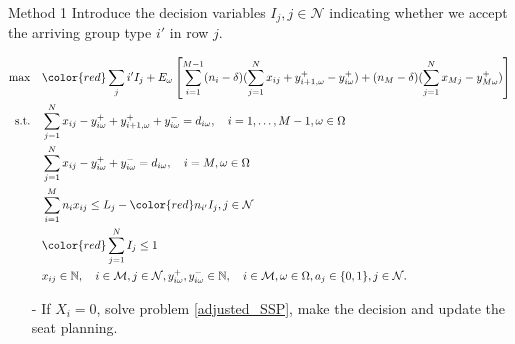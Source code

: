   \begin{frame}{Method 1}
    \small
    Introduce the decision variables $I_j, j \in \mathcal{N}$ indicating whether we accept the arriving group type $i{'}$ in row $j$.
    
      \begin{tiny}
        \begin{equation}\label{adjusted_SSP}
        \begin{aligned}
        \max \quad & {\color{red}\sum_{j} i{'} I_j} + E_{\omega}\left[\sum_{i=1}^{M-1} (n_i-\delta) (\sum_{j= 1}^{N} x_{ij} + y_{i+1,\omega}^{+} - y_{i \omega}^{+}) + (n_{M}-\delta) (\sum_{j= 1}^{N} x_{Mj} - y_{M \omega}^{+})\right] \\
        \text {s.t.} \quad & \sum_{j= 1}^{N} x_{ij}-y_{i \omega}^{+}+
        y_{i+1, \omega}^{+} + y_{i \omega}^{-}=d_{i \omega}, \quad i = 1,\ldots,M-1, \omega \in \Omega \\
        & \sum_{j= 1}^{N} x_{ij} -y_{i \omega}^{+}+y_{i \omega}^{-}=d_{i \omega}, \quad i = M, \omega \in \Omega \\
        & \sum_{i=1}^{M} n_{i} x_{ij} \leq L_j - {\color{red}n_{i{'}} I_j}, j \in \mathcal{N} \\
        & {\color{red}\sum_{j=1}^{N} I_j \leq 1} \\
        & x_{ij} \in \mathbb{N}, \quad i \in \mathcal{M}, j \in \mathcal{N}, y_{i \omega}^{+}, y_{i \omega}^{-} \in \mathbb{N}, \quad i \in \mathcal{M}, \omega \in \Omega,  a_j \in \{0,1\}, j \in \mathcal{N}.
        \end{aligned}
      \end{equation}
    \end{tiny}
    \begin{itemize}      
      \item[-] If $X_i = 0$, solve problem \eqref{adjusted_SSP}, make the decision and update the seat planning.
    \end{itemize}
  \end{frame}

      
      
